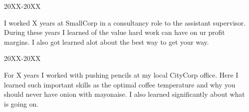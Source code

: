 





\begin{timeline}
\item \subtitle{SmallCorp}
	\hfill 20XX-20XX

	{\small I worked X years at SmallCorp in a consultancy role to the assistant supervisor. During these years I learned of the value hard work can have on ur profit margins. I also got learned alot about the best way to get your way.}

\item \subtitle{CityCorp}
	\hfill 20XX-20XX

	{\small For X years I worked with pushing pencils at my local CityCorp office. Here I learned such important skills as the optimal coffee temperature and why you should never have onion with mayonaise. I also learned significantly about what is going on.}

\end{timeline}
